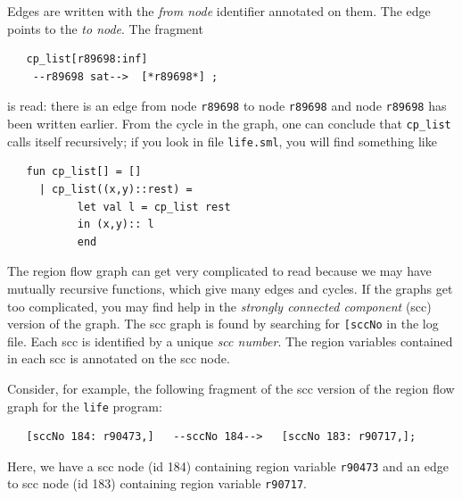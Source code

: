 \documentclass[12pt]{book}
\begin{document}
Edges are written with the {\em from node\/} identifier annotated on
them. The edge points to the \emph{to node}. The fragment
\begin{verbatim}
   cp_list[r89698:inf]
    --r89698 sat-->  [*r89698*] ;
\end{verbatim}
is read: there is an edge from node \texttt{r89698} to node
\texttt{r89698} and node \texttt{r89698} has been written earlier. From
the cycle in the graph, one can conclude that \texttt{cp\_list} calls
itself recursively; if you look in file {\tt life.sml}, you will
find something like
\begin{verbatim}
   fun cp_list[] = []
     | cp_list((x,y)::rest) = 
           let val l = cp_list rest
           in (x,y):: l
           end
\end{verbatim}


The region flow graph can get very complicated to read because we may have
mutually recursive functions, which give many edges and cycles.  If the
graphs get too complicated, you may find help in the 
%
{\em strongly connected component\/} (scc) version of the graph.  The
scc graph is found by searching for \texttt{[sccNo} in the log file.
Each scc is identified by a unique {\em scc number}. The region
variables contained in each scc is annotated on the scc node.

Consider, for example, the following fragment of the scc version of
the region flow graph for the {\tt life} program:
\begin{verbatim}
   [sccNo 184: r90473,]   --sccNo 184-->   [sccNo 183: r90717,];
\end{verbatim}
Here, we have a scc node (id 184) containing region variable
\texttt{r90473} and an edge to scc node (id 183) containing region
variable \texttt{r90717}.

\end{document}
